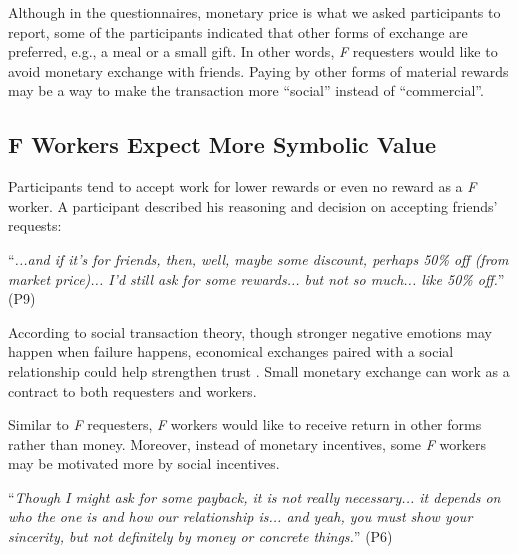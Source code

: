Although in the questionnaires, monetary price is what we asked participants to report, 
some of the participants indicated that other forms of exchange are preferred, e.g., a meal or a small gift.
In other words, \emph{F} requesters would like to avoid monetary exchange with friends. 
Paying by other forms of material rewards may be a way to make the transaction more ``social'' instead of ``commercial''.



\subsection{F Workers Expect More Symbolic Value}
Participants tend to accept work for lower rewards or even no reward as a \emph{F} worker. 
A participant described his reasoning and decision on accepting friends' requests:

``\emph{...and if it's for friends, then, well, maybe some discount, perhaps 50\% off (from market price)... 
I'd still ask for some rewards... but not so much... like 50\% off.}'' (P9)


According to social transaction theory,
though stronger negative emotions may happen when failure happens, 
economical exchanges paired with a social relationship could help strengthen trust \cite{Cropanzano:JoM05:SocExTheory}. 
Small monetary exchange can work as a contract to both requesters and workers. 

Similar to \emph{F} requesters, \emph{F} workers would like to receive return in other forms rather than money.
Moreover, instead of monetary incentives, some \emph{F} workers may be motivated more by social incentives. 

``\emph{Though I might ask for some payback, it is not really necessary... 
it depends on who the one is and how our relationship is... 
and yeah, you must show your sincerity, but not definitely by money or concrete things.}'' (P6)

